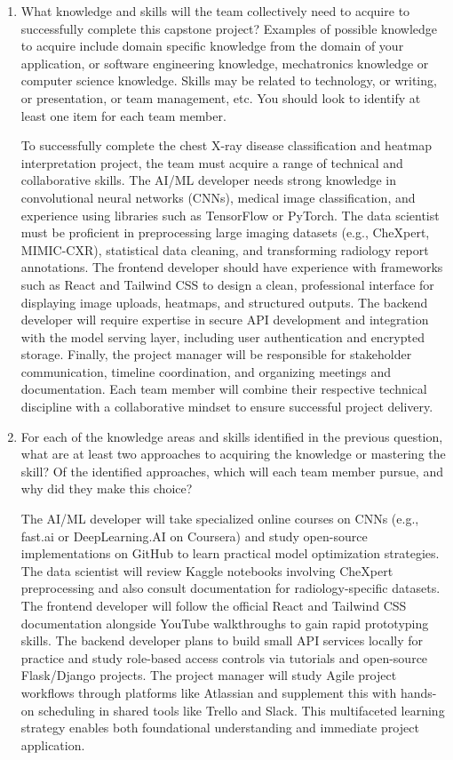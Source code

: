\documentclass[12pt]{article}
\begin{document}
\begin{enumerate}
  \item What knowledge and skills will the team collectively need to acquire to
  successfully complete this capstone project? Examples of possible knowledge
  to acquire include domain specific knowledge from the domain of your
  application, or software engineering knowledge, mechatronics knowledge or
  computer science knowledge. Skills may be related to technology, or writing,
  or presentation, or team management, etc. You should look to identify at
  least one item for each team member.

  To successfully complete the chest X-ray disease classification and heatmap interpretation project, the team must acquire a range of technical and collaborative skills. The AI/ML developer needs strong knowledge in convolutional neural networks (CNNs), medical image classification, and experience using libraries such as TensorFlow or PyTorch. The data scientist must be proficient in preprocessing large imaging datasets (e.g., CheXpert, MIMIC-CXR), statistical data cleaning, and transforming radiology report annotations. The frontend developer should have experience with frameworks such as React and Tailwind CSS to design a clean, professional interface for displaying image uploads, heatmaps, and structured outputs. The backend developer will require expertise in secure API development and integration with the model serving layer, including user authentication and encrypted storage. Finally, the project manager will be responsible for stakeholder communication, timeline coordination, and organizing meetings and documentation. Each team member will combine their respective technical discipline with a collaborative mindset to ensure successful project delivery.

  \item For each of the knowledge areas and skills identified in the previous
  question, what are at least two approaches to acquiring the knowledge or
  mastering the skill? Of the identified approaches, which will each team
  member pursue, and why did they make this choice?

  The AI/ML developer will take specialized online courses on CNNs (e.g., fast.ai or DeepLearning.AI on Coursera) and study open-source implementations on GitHub to learn practical model optimization strategies. The data scientist will review Kaggle notebooks involving CheXpert preprocessing and also consult documentation for radiology-specific datasets. The frontend developer will follow the official React and Tailwind CSS documentation alongside YouTube walkthroughs to gain rapid prototyping skills. The backend developer plans to build small API services locally for practice and study role-based access controls via tutorials and open-source Flask/Django projects. The project manager will study Agile project workflows through platforms like Atlassian and supplement this with hands-on scheduling in shared tools like Trello and Slack. This multifaceted learning strategy enables both foundational understanding and immediate project application.
\end{enumerate}
\end{document}
